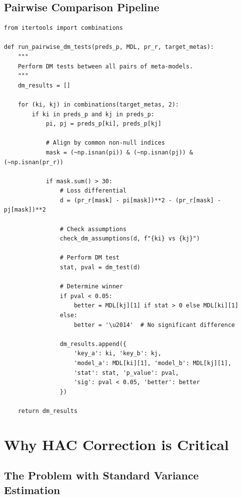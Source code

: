 \documentclass[11pt,a4paper]{article}
\begin{document}
\subsection{Pairwise Comparison Pipeline}

\begin{lstlisting}[caption={Pairwise DM Test Runner}]
from itertools import combinations

def run_pairwise_dm_tests(preds_p, MDL, pr_r, target_metas):
    """
    Perform DM tests between all pairs of meta-models.
    """
    dm_results = []
    
    for (ki, kj) in combinations(target_metas, 2):
        if ki in preds_p and kj in preds_p:
            pi, pj = preds_p[ki], preds_p[kj]
            
            # Align by common non-null indices
            mask = (~np.isnan(pi)) & (~np.isnan(pj)) & (~np.isnan(pr_r))
            
            if mask.sum() > 30:
                # Loss differential
                d = (pr_r[mask] - pi[mask])**2 - (pr_r[mask] - pj[mask])**2
                
                # Check assumptions
                check_dm_assumptions(d, f"{ki} vs {kj}")
                
                # Perform DM test
                stat, pval = dm_test(d)
                
                # Determine winner
                if pval < 0.05:
                    better = MDL[kj][1] if stat > 0 else MDL[ki][1]
                else:
                    better = '\u2014'  # No significant difference
                
                dm_results.append({
                    'key_a': ki, 'key_b': kj,
                    'model_a': MDL[ki][1], 'model_b': MDL[kj][1],
                    'stat': stat, 'p_value': pval, 
                    'sig': pval < 0.05, 'better': better
                })
    
    return dm_results
\end{lstlisting}

\section{Why HAC Correction is Critical}

\subsection{The Problem with Standard Variance Estimation}
\end{document}
